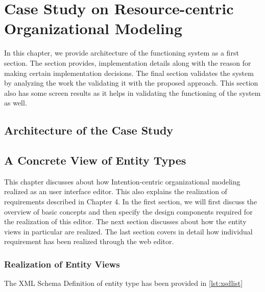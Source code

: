 \chapter{Case Study on Resource-centric Organizational Modeling}
\label{chap:casestudy}

In this chapter, we provide architecture of the functioning system as a first section. The section provides, implementation details along with the reason for making certain implementation decisions. The final section validates the system by analyzing the work the validating it with the proposed approach. This section also has some screen results as it helps in validating the functioning of the system as well.

\section{Architecture of the Case Study}
\label{sec:casestudyarchitecture}



\section{A Concrete View of Entity Types}
\label{sec:realization}

 This chapter discusses about how Intention-centric organizational modeling realized as an user interface editor. This also explains the realization of requirements described in Chapter 4. In the first section, we will first discuss the overview of basic concepts and then specify the design components required for the realization of this editor. The next section discusses about how the entity views in particular are realized. The last section covers in detail how individual requirement has been realized through the web editor.




\subsection{Realization of Entity Views}
\label{subsec:realofentityviews}
The XML Schema Definition of entity type has been provided in \ref{lst:xsdlist}




